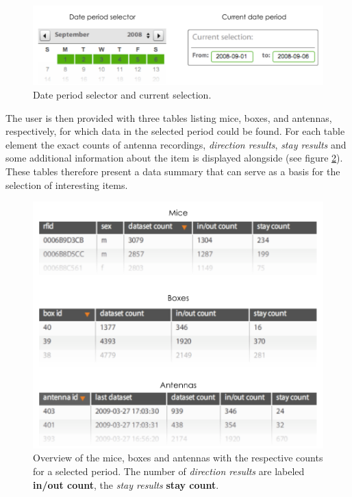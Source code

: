 \begin{figure}[htpb]
\begin{center}
  \includegraphics[width=.75\textwidth]{assets/pdf/date_period.pdf}
  \caption[Date period selector]{Date period selector and current selection.}
  \label{fig:date_period}
\end{center}
\end{figure}

The user is then provided with three tables listing mice, boxes, and antennas, respectively, for which data in the selected period could be found. For each table element the exact counts of antenna recordings, \textit{direction results}, \textit{stay results} and some additional information about the item is displayed alongside (see figure \ref{fig:data_overview_with_count}). These tables therefore present a data summary that can serve as a basis for the selection of interesting items. 

\begin{figure}[htpb]
\begin{center}
  \includegraphics[width=.66\textwidth]{assets/pdf/overview_list.pdf}
  \caption[Overview of the summarized data for mice, boxes and antennas within a date period]{Overview of the mice, boxes and antennas with the respective counts for a selected period. The number of \textit{direction results} are labeled \textbf{in/out count}, the \textit{stay results}  \textbf{stay count}.}
  \label{fig:data_overview_with_count}
\end{center}
\end{figure}

